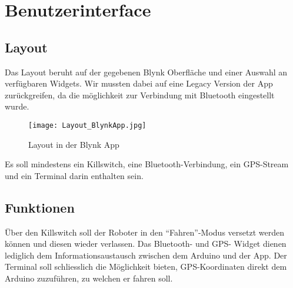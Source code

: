 \section{Benutzerinterface}

\subsection{Layout}
Das Layout beruht auf der gegebenen Blynk Oberfläche und einer Auswahl an verfügbaren Widgets. Wir mussten dabei auf eine Legacy Version der App zurückgreifen, da die möglichkeit zur Verbindung mit Bluetooth eingestellt wurde.

\begin{figure}[H]
    \begin{center}
    \texttt{[image: Layout\_BlynkApp.jpg]}
    \end{center}
    \caption{Layout in der Blynk App}
\end{figure}

Es soll mindestens ein Killswitch, eine Bluetooth-Verbindung, ein GPS-Stream und ein Terminal darin enthalten sein.

\subsection{Funktionen}
Über den Killswitch soll der Roboter in den “Fahren”-Modus versetzt werden können und diesen wieder verlassen. Das Bluetooth- und GPS- Widget dienen lediglich dem Informationsaustausch zwischen dem Arduino und der App. Der Terminal soll schliesslich die Möglichkeit bieten, GPS-Koordinaten direkt dem Arduino zuzuführen, zu welchen er fahren soll.